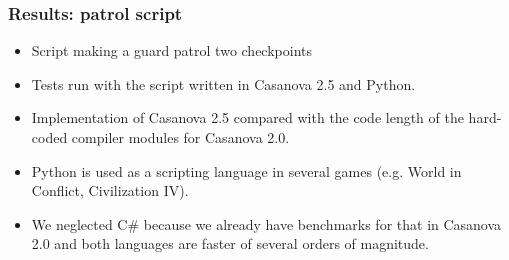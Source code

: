 \documentclass[10pt,a4paper]{beamer}
\begin{document}
\begin{frame}
	\frametitle{Results: patrol script}
	\begin{itemize}
		\item Script making a guard patrol two checkpoints
		\item Tests run with the script written in Casanova 2.5 and Python.
		\item Implementation of Casanova 2.5 compared with the code length of the hard-coded compiler modules for Casanova 2.0.
		\item Python is used as a scripting language in several games (e.g. World in Conflict, Civilization IV).
		\item We neglected C\# because we already have benchmarks for that in Casanova 2.0 and both languages are faster of several orders of magnitude.
	\end{itemize}
\end{frame}
\end{document}
